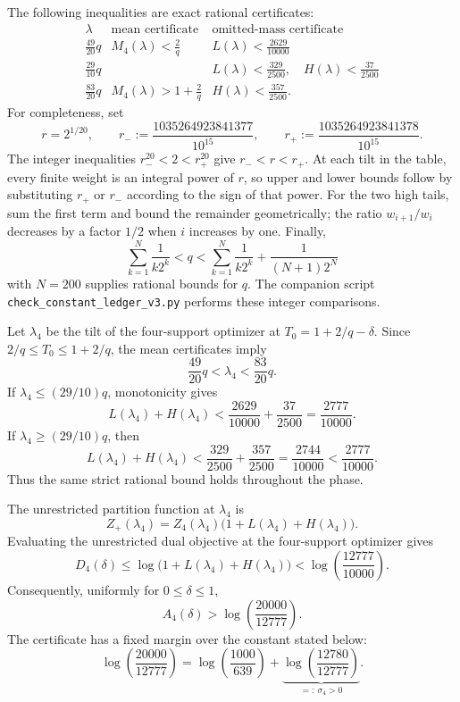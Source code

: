 The following inequalities are exact rational certificates:
\[
\begin{array}{c|c|c}
\lambda & \text{mean certificate} & \text{omitted-mass certificate}\\
\hline
\frac{49}{20}q
  & M_4(\lambda)<\frac{2}{q}
  & L(\lambda)<\frac{2629}{10000}\\[2mm]
\frac{29}{10}q
  & {}
  & L(\lambda)<\frac{329}{2500},\quad
    H(\lambda)<\frac{37}{2500}\\[2mm]
\frac{83}{20}q
  & M_4(\lambda)>1+\frac{2}{q}
  & H(\lambda)<\frac{357}{2500}.
\end{array}
\]
For completeness, set
\[
  r=2^{1/20},
  \qquad
  r_-:=\frac{1035264923841377}{10^{15}},
  \qquad
  r_+:=\frac{1035264923841378}{10^{15}}.
\]
The integer inequalities $r_-^{20}<2<r_+^{20}$ give
$r_-<r<r_+$. At each tilt in the table, every finite weight is an integral
power of $r$, so upper and lower bounds follow by substituting $r_+$ or $r_-$
according to the sign of that power. For the two high tails, sum the first term
and bound the remainder geometrically; the ratio $w_{i+1}/w_i$ decreases by a
factor $1/2$ when $i$ increases by one. Finally,
\[
  \sum_{k=1}^{N}\frac{1}{k2^k}
  <q<
  \sum_{k=1}^{N}\frac{1}{k2^k}
  +\frac{1}{(N+1)2^N}
\]
with $N=200$ supplies rational bounds for $q$. The companion script
\texttt{check\_constant\_ledger\_v3.py} performs these integer comparisons.

Let $\lambda_4$ be the tilt of the four-support optimizer at
$T_0=1+2/q-\delta$. Since $2/q\le T_0\le1+2/q$, the mean certificates imply
\[
  \frac{49}{20}q<\lambda_4<\frac{83}{20}q.
\]
If $\lambda_4\le(29/10)q$, monotonicity gives
\[
  L(\lambda_4)+H(\lambda_4)
  <
  \frac{2629}{10000}+\frac{37}{2500}
  =
  \frac{2777}{10000}.
\]
If $\lambda_4\ge(29/10)q$, then
\[
  L(\lambda_4)+H(\lambda_4)
  <
  \frac{329}{2500}+\frac{357}{2500}
  =
  \frac{2744}{10000}
  <
  \frac{2777}{10000}.
\]
Thus the same strict rational bound holds throughout the phase.

The unrestricted partition function at $\lambda_4$ is
\[
  Z_+(\lambda_4)
  =Z_4(\lambda_4)
   \bigl(1+L(\lambda_4)+H(\lambda_4)\bigr).
\]
Evaluating the unrestricted dual objective at the four-support optimizer gives
\[
  D_4(\delta)
  \le
  \log\bigl(1+L(\lambda_4)+H(\lambda_4)\bigr)
  <
  \log\!\left(\frac{12777}{10000}\right).
\]
Consequently, uniformly for $0\le\delta\le1$,
\begin{equation}
  A_4(\delta)
  >
  \log\!\left(\frac{20000}{12777}\right).
  \label{eq:exact-four-support-certificate-v4}
\end{equation}
The certificate has a fixed margin over the constant stated below:
\begin{equation}
  \log\!\left(\frac{20000}{12777}\right)
  =
  \log\!\left(\frac{1000}{639}\right)
  +
  \underbrace{\log\!\left(\frac{12780}{12777}\right)}_{=:~\sigma_4>0}.
  \label{eq:fixed-four-support-slack-v4}
\end{equation}

